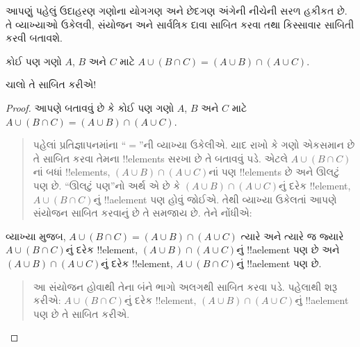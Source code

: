 \documentclass[../../../include/open-logic-section]{subfiles}
\begin{document}


આપણું પહેલું ઉદાહરણ ગણોના યોગગણ અને છેદગણ અંગેની નીચેની
સરળ હકીકત છે. તે વ્યાખ્યાઓ ઉકેલવી, સંયોજન અને સાર્વત્રિક દાવા
સાબિત કરવા તથા કિસ્સાવાર સાબિતી કરવી બતાવશે.

\begin{prop}
કોઈ પણ ગણો $A$, $B$ અને $C$ માટે $A \cup (B \cap C) = (A \cup B)
\cap (A \cup C)$.
\end{prop}

ચાલો તે સાબિત કરીએ!{}

\begin{proof}
આપણે બતાવવું છે કે કોઈ પણ ગણો $A$, $B$ અને $C$ માટે $A \cup (B \cap
C) = (A \cup B) \cap (A \cup C)$.
\begin{quote}
પહેલાં પ્રતિજ્ઞાપનમાંના ``$=$''ની વ્યાખ્યા ઉકેલીએ. યાદ રાખો કે
ગણો એકસમાન છે તે સાબિત કરવા તેમના !!{element}s સરખા છે તે
બતાવવું પડે. એટલે $A \cup
(B \cap C)$નાં બધાં !!{element}s, $(A \cup B) \cap (A \cup C)$નાં
પણ !!{element}s છે અને ઊલટું પણ છે. ``ઊલટું પણ''નો અર્થ
એ છે કે $(A
\cup B) \cap (A \cup C)$નું દરેક !!{element}, $A \cup (B \cap
C)$નું !!a{element} પણ હોવું જોઈએ. તેથી વ્યાખ્યા ઉકેલતાં
આપણે સંયોજન સાબિત કરવાનું છે તે સમજાય છે. તેને નોંધીએ:
\end{quote}
વ્યાખ્યા મુજબ, $A \cup (B \cap C) = (A \cup B) \cap (A \cup C)$
ત્યારે અને ત્યારે જ જ્યારે $A \cup (B \cap C)$નું દરેક
!!{element}, $(A
\cup B) \cap (A \cup C)$નું !!a{element} પણ છે અને
$(A \cup B) \cap (A
\cup C)$નું દરેક !!{element}, $A \cup (B \cap C)$નું
!!a{element} પણ છે.
\begin{quote}
આ સંયોજન હોવાથી તેના બંને ભાગો અલગથી સાબિત કરવા પડે.
પહેલાથી શરૂ કરીએ: $A \cup (B \cap C)$નું દરેક
!!{element}, $(A
\cup B) \cap (A \cup C)$નું !!a{element} પણ છે તે સાબિત કરીએ.


\end{quote}
\end{proof}
\end{document}

